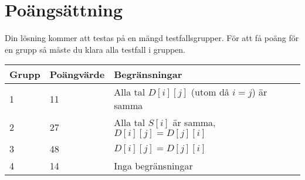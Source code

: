 \section*{Poängsättning}
Din lösning kommer att testas på en mängd testfallsgrupper. För att få poäng för en grupp
så måste du klara alla testfall i gruppen.

\noindent
\begin{tabular}{| l | l | l | l |}
\hline
Grupp & Poängvärde & Begränsningar \\ \hline
1     & 11         & Alla tal $D[i][j]$ (utom då $i = j$) är samma \\ \hline
2     & 27         & Alla tal $S[i]$ är samma, $D[i][j] = D[j][i]$\\ \hline
3     & 48         & $D[i][j] = D[j][i]$ \\ \hline
4     & 14         & Inga begränsningar \\ \hline
\end{tabular}
